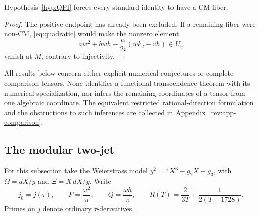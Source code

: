 \begin{proposition}\label{prop:CMforcing}
Hypothesis~\ref{hyp:QPI} forces every standard identity to have a CM fiber.
\end{proposition}
\begin{proof}
The positive endpoint has already been excluded.  If a remaining fiber
were non-CM, \eqref{eq:quadratic} would make the nonzero element
\[
 aw^2+bwh-\frac{\alpha}{2i}(wk_2-vh)\in U_\gamma
\]
vanish at $M$, contrary to injectivity.
\end{proof}

All results below concern either explicit numerical conjectures or
complete comparison tensors.  None identifies a functional
transcendence theorem with its numerical specialization, nor infers
the remaining coordinates of a tensor from one algebraic coordinate.
The equivalent restricted rational-direction formulation and the
obstructions to such inferences are collected in
Appendix~\ref{rev:app-comparison}.

\subsection{The modular two-jet}\label{subsec:modular-jets}
For this subsection take the Weierstrass model
$y^2=4X^3-g_2X-g_3$, with $\Omega=dX/y$ and $\Xi=X\,dX/y$.
Write
\[
 j_0=j(\tau),\qquad P=\frac{\omega^2}{\pi},\qquad
 Q=\frac{\omega h}{\pi},\qquad
 R(T)=\frac{2}{3T}+\frac1{2(T-1728)}.
\]
Primes on $j$ denote ordinary $\tau$-derivatives.

